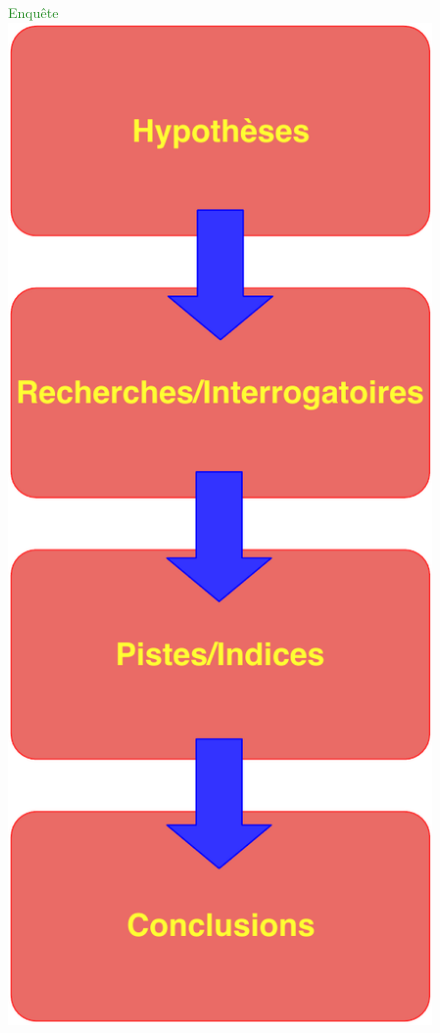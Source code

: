 \documentclass[usenames, dvipsnames]{beamer}
\begin{document}
\begin{frame}[plain]
\begin{figure}
\begin{minipage}[c]{.46\linewidth}
\end{minipage} \hfill
\begin{minipage}[c]{.46\linewidth}
\centering
\textcolor{ForestGreen}{Enquête}
\hspace{3em}\includegraphics[scale=.4]{images/enth/en4.pdf}
\end{minipage}
\end{figure}



\end{frame}
\end{document}
